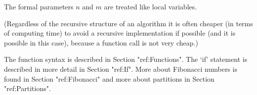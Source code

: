 The formal parameters $n$ and $m$ are treated like local variables.

(Regardless of the recursive structure of an algorithm it is often cheaper
(in  terms of computing time) to avoid a recursive implementation if possible
(and it is possible in this case), because a function call is not very cheap.)


The function  syntax is described  in Section "ref:Functions".   The `if'
statement is described  in more detail in  Section "ref:If".  More  about
Fibonacci  numbers is found  in  Section "ref:Fibonacci"  and more  about
partitions in Section "ref:Partitions".


